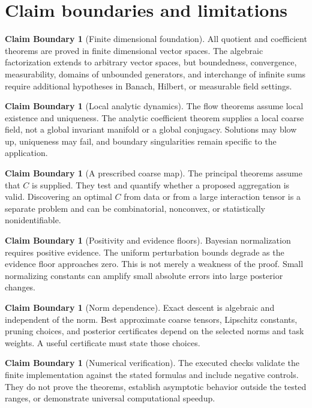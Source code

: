 \documentclass[11pt]{article}
\theoremstyle{definition}
\newtheorem{boundary}[theorem]{Claim Boundary}
\theoremstyle{remark}
\begin{document}
\section{Claim boundaries and limitations}\label{sec:limitations}

\begin{boundary}[Finite dimensional foundation]
All quotient and coefficient theorems are proved in finite dimensional vector spaces.  The algebraic factorization extends to arbitrary vector spaces, but boundedness, convergence, measurability, domains of unbounded generators, and interchange of infinite sums require additional hypotheses in Banach, Hilbert, or measurable field settings.
\end{boundary}

\begin{boundary}[Local analytic dynamics]
The flow theorems assume local existence and uniqueness.  The analytic coefficient theorem supplies a local coarse field, not a global invariant manifold or a global conjugacy.  Solutions may blow up, uniqueness may fail, and boundary singularities remain specific to the application.
\end{boundary}

\begin{boundary}[A prescribed coarse map]
The principal theorems assume that $C$ is supplied.  They test and quantify whether a proposed aggregation is valid.  Discovering an optimal $C$ from data or from a large interaction tensor is a separate problem and can be combinatorial, nonconvex, or statistically nonidentifiable.
\end{boundary}

\begin{boundary}[Positivity and evidence floors]
Bayesian normalization requires positive evidence.  The uniform perturbation bounds degrade as the evidence floor approaches zero.  This is not merely a weakness of the proof.  Small normalizing constants can amplify small absolute errors into large posterior changes.
\end{boundary}

\begin{boundary}[Norm dependence]
Exact descent is algebraic and independent of the norm.  Best approximate coarse tensors, Lipschitz constants, pruning choices, and posterior certificates depend on the selected norms and task weights.  A useful certificate must state those choices.
\end{boundary}

\begin{boundary}[Numerical verification]
The executed checks validate the finite implementation against the stated formulas and include negative controls.  They do not prove the theorems, establish asymptotic behavior outside the tested ranges, or demonstrate universal computational speedup.
\end{boundary}
\end{document}
